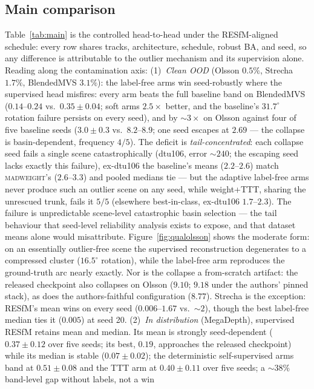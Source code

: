 \documentclass[10pt,twocolumn,letterpaper]{article}
\newcommand{\mad}{\textsc{madweight}}
\renewcommand{\deg}{^{\circ}}
\begin{document}
\subsection{Main comparison}
Table~\ref{tab:main} is the controlled head-to-head under the RESfM-aligned schedule:
every row shares tracks, architecture, schedule, robust BA, and seed, so any difference is
attributable to the outlier mechanism and its supervision alone. Reading along the
contamination axis:
(1)~\emph{Clean OOD} (Olsson $0.5\%$, Strecha $1.7\%$, BlendedMVS $3.1\%$): the
label-free arms win seed-robustly where the supervised head misfires: every arm beats
the full baseline band on BlendedMVS ($0.14$--$0.24$ vs.\ $0.35\pm0.04$; soft arms
$2.5\times$ better, and the baseline's $31.7\deg$ rotation failure persists on every
seed), and by ${\sim}3\times$ on Olsson against four of five baseline seeds
($3.0\pm0.3$ vs.\ $8.2$--$8.9$; one seed escapes at $2.69$ --- the collapse is
basin-dependent, frequency $4/5$). The deficit is \emph{tail-concentrated}: each
collapse seed fails a single scene catastrophically (dtu106, error ${\sim}240$; the
escaping seed lacks exactly this failure), ex-dtu106 the baseline's means
($2.2$--$2.6$) match \mad{}'s ($2.6$--$3.3$) and pooled medians tie --- but the
adaptive label-free arms never produce such an outlier scene on any seed, while
weight+TTT, sharing the unrescued trunk, fails it $5/5$ (elsewhere best-in-class,
ex-dtu106 $1.7$--$2.3$). The failure is unpredictable scene-level catastrophic basin
selection --- the tail behaviour that seed-level reliability analysis exists to
expose, and that dataset means alone would misattribute. Figure~\ref{fig:qualolsson}
shows the moderate form: on an essentially outlier-free scene the supervised reconstruction degenerates to
a compressed cluster ($16.5\deg$ rotation), while the label-free arm reproduces the
ground-truth arc nearly exactly. Nor is the collapse a from-scratch artifact: the
released checkpoint also collapses on Olsson ($9.10$; $9.18$ under the authors' pinned
stack), as does the authors-faithful configuration ($8.77$). Strecha is the exception:
RESfM's mean wins on every seed ($0.006$--$1.67$ vs.\ $\sim\!2$), though the best
label-free median ties it ($0.005$) at seed 20.
(2)~\emph{In distribution} (MegaDepth), supervised RESfM retains mean and median.
Its mean is strongly seed-dependent ($0.37\pm0.12$ over five seeds; its best, $0.19$,
approaches the released checkpoint) while its median is stable ($0.07\pm0.02$); the
deterministic self-supervised arms band at $0.51\pm0.08$ and the TTT arm at
$0.40\pm0.11$ over five seeds; a $\sim\!38\%$ band-level gap without labels, not a win
\end{document}

